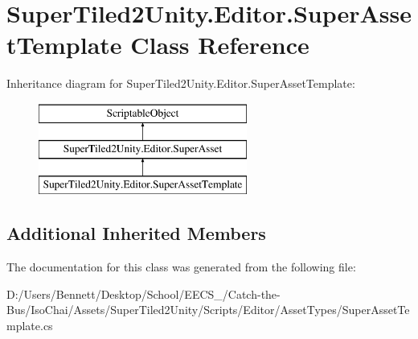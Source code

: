 \hypertarget{class_super_tiled2_unity_1_1_editor_1_1_super_asset_template}{}\section{Super\+Tiled2\+Unity.\+Editor.\+Super\+Asset\+Template Class Reference}
\label{class_super_tiled2_unity_1_1_editor_1_1_super_asset_template}
Inheritance diagram for Super\+Tiled2\+Unity.\+Editor.\+Super\+Asset\+Template\+:\begin{figure}[H]
\begin{center}
\leavevmode
\includegraphics[height=3.000000cm]{class_super_tiled2_unity_1_1_editor_1_1_super_asset_template}
\end{center}
\end{figure}
\subsection*{Additional Inherited Members}


The documentation for this class was generated from the following file\+:\begin{DoxyCompactItemize}
\item 
D\+:/\+Users/\+Bennett/\+Desktop/\+School/\+E\+E\+C\+S\+\_/\+Catch-\/the-\/\+Bus/\+Iso\+Chai/\+Assets/\+Super\+Tiled2\+Unity/\+Scripts/\+Editor/\+Asset\+Types/Super\+Asset\+Template.\+cs\end{DoxyCompactItemize}

